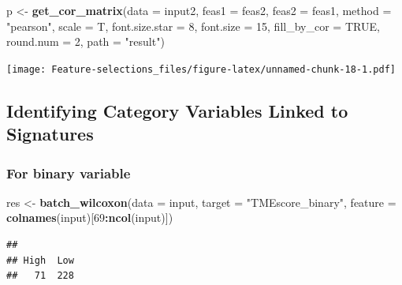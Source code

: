\documentclass[
  12pt,
]{book}
\newenvironment{Shaded}{\begin{snugshade}}{\end{snugshade}}
\newcommand{\AttributeTok}[1]{\textcolor[rgb]{0.13,0.29,0.53}{#1}}
\newcommand{\ConstantTok}[1]{\textcolor[rgb]{0.56,0.35,0.01}{#1}}
\newcommand{\DecValTok}[1]{\textcolor[rgb]{0.00,0.00,0.81}{#1}}
\newcommand{\FunctionTok}[1]{\textcolor[rgb]{0.13,0.29,0.53}{\textbf{#1}}}
\newcommand{\NormalTok}[1]{#1}
\newcommand{\OtherTok}[1]{\textcolor[rgb]{0.56,0.35,0.01}{#1}}
\newcommand{\SpecialCharTok}[1]{\textcolor[rgb]{0.81,0.36,0.00}{\textbf{#1}}}
\newcommand{\StringTok}[1]{\textcolor[rgb]{0.31,0.60,0.02}{#1}}
\begin{document}
\begin{Shaded}
\begin{Highlighting}[]
\NormalTok{p }\OtherTok{\textless{}{-}} \FunctionTok{get\_cor\_matrix}\NormalTok{(}\AttributeTok{data           =}\NormalTok{ input2, }
                    \AttributeTok{feas1          =}\NormalTok{ feas2, }
                    \AttributeTok{feas2          =}\NormalTok{ feas1,}
                    \AttributeTok{method         =} \StringTok{"pearson"}\NormalTok{,}
                    \AttributeTok{scale          =}\NormalTok{ T, }
                    \AttributeTok{font.size.star =} \DecValTok{8}\NormalTok{, }
                    \AttributeTok{font.size      =} \DecValTok{15}\NormalTok{, }
                    \AttributeTok{fill\_by\_cor    =} \ConstantTok{TRUE}\NormalTok{, }
                    \AttributeTok{round.num      =} \DecValTok{2}\NormalTok{,}
                    \AttributeTok{path           =} \StringTok{"result"}\NormalTok{)}
\end{Highlighting}
\end{Shaded}

\texttt{[image: Feature-selections\_files/figure-latex/unnamed-chunk-18-1.pdf]}

\hypertarget{identifying-category-variables-linked-to-signatures}{%
\subsection{Identifying Category Variables Linked to Signatures}\label{identifying-category-variables-linked-to-signatures}}

\hypertarget{for-binary-variable}{%
\subsubsection{For binary variable}\label{for-binary-variable}}

\begin{Shaded}
\begin{Highlighting}[]
\NormalTok{res }\OtherTok{\textless{}{-}} \FunctionTok{batch\_wilcoxon}\NormalTok{(}\AttributeTok{data =}\NormalTok{ input, }\AttributeTok{target =} \StringTok{"TMEscore\_binary"}\NormalTok{, }\AttributeTok{feature =} \FunctionTok{colnames}\NormalTok{(input)[}\DecValTok{69}\SpecialCharTok{:}\FunctionTok{ncol}\NormalTok{(input)])}
\end{Highlighting}
\end{Shaded}

\begin{verbatim}
## 
## High  Low 
##   71  228
\end{verbatim}
\end{document}
